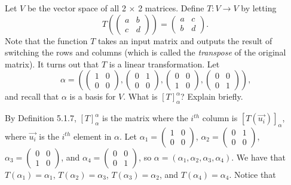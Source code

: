 \documentclass[12pt]{article}
\newenvironment{problem}[2][Problem]
{
	\begin{trivlist} 
		\item[\hskip \labelsep {\bfseries #1 #2:}]
	}
{
	\end{trivlist}
	}
\newenvironment{solution}[1][Solution]
{
	\begin{trivlist} 
		\item[\hskip \labelsep {\itshape #1:}]
	}
	{
	\end{trivlist}
}
\begin{document}
\newpage
\begin{problem}{2}
Let $V$ be the vector space of all 2 $\times$ 2 matrices. Define $T:V \to V$ by letting
\[
T\left( \begin{pmatrix} a&b\\c&d\end{pmatrix} \right) = \begin{pmatrix} a&c\\b&d \end{pmatrix}\text{.}
\]
Note that the function $T$ takes an input matrix and outputs the result of switching the rows and columns (which is called the {\it transpose} of the original matrix). It turns out that $T$ is a linear transformation. Let
\[
\alpha=\left( \begin{pmatrix} 1&0\\0&0 \end{pmatrix}, \begin{pmatrix} 0&1\\0&0 \end{pmatrix}, \begin{pmatrix} 0&0\\1&0 \end{pmatrix}, \begin{pmatrix} 0&0\\0&1 \end{pmatrix} \right) \text{,}
\]
and recall that $\alpha$ is a basis for $V$. What is $[T]_\alpha ^\alpha$? Explain briefly.
\noindent
\newline
\newline
\begin{solution}
By Definition 5.1.7, $[T]^\alpha _\alpha$ is the matrix where the $i^{th}$ column is $[T(\vec{u_i})]_\alpha$, where $\vec{u_i}$ is the $i^{th}$ element in $\alpha$. Let 
$\alpha_1=\begin{pmatrix} 1&0\\0&0 \end{pmatrix}$, 
$\alpha_2=\begin{pmatrix} 0&1\\0&0 \end{pmatrix}$, 
$\alpha_3=\begin{pmatrix} 0&0\\1&0 \end{pmatrix}$, and 
$\alpha_4=\begin{pmatrix} 0&0\\0&1 \end{pmatrix}$, so $\alpha = (\alpha_1,\alpha_2,\alpha_3,\alpha_4)$. We have that $T(\alpha_1)=\alpha_1$, $T(\alpha_2)=\alpha_3$, $T(\alpha_3)=\alpha_2$, and $T(\alpha_4)=\alpha_4$. Notice that

\end{solution}
\end{problem}
\end{document}
